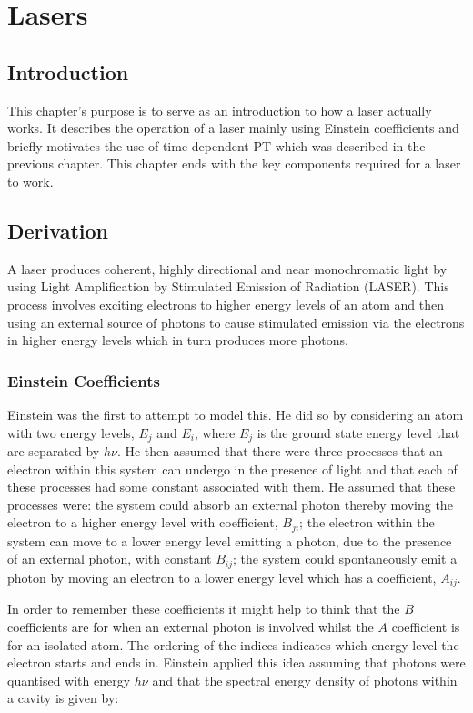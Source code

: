 \chapter{Lasers}
\label{chapt8}

\section{Introduction}

This chapter's purpose is to serve as an introduction to how a laser actually works. It describes the operation of a laser mainly using Einstein coefficients and briefly motivates the use of time dependent PT which was described in the previous chapter. This chapter ends with the key components required for a laser to  work.

\section{Derivation}

A laser produces coherent, highly directional and near monochromatic light by using Light Amplification by Stimulated Emission of Radiation (LASER). This process involves exciting electrons to higher energy levels of an atom and then using an external source of photons to cause stimulated emission via the electrons in higher energy levels which in turn produces more photons.

\subsection{Einstein Coefficients}

Einstein was the first to attempt to model this. He did so by considering an atom with two energy levels, $E_j$ and $E_i$, where $E_j$ is the ground state energy level that are separated by $h\nu$. He then assumed that there were three processes that an electron within this system can undergo in the presence of light and that each of these processes had some constant associated with them. He assumed that these processes were: the system could absorb an external photon thereby moving the electron to a higher energy level with coefficient, $B_{ji}$; the electron within the system can move to a lower energy level emitting a photon, due to the presence of an external photon, with constant $B_{ij}$; the system could spontaneously emit a photon by moving an electron to a lower energy level which has a coefficient, $A_{ij}$. 

\noindent In order to remember these coefficients it might help to think that the $B$ coefficients are for when an external photon is involved whilst the $A$ coefficient is for an isolated atom. The ordering of the indices indicates which energy level the electron starts and ends in. Einstein applied this idea assuming that photons were quantised with energy $h\nu$ and that the spectral energy density of photons within a cavity is given by:


